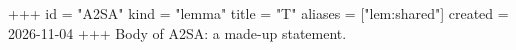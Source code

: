 +++
id = "A2SA"
kind = "lemma"
title = "T"
aliases = ["lem:shared"]
created = 2026-11-04
+++
Body of A2SA: a made-up statement.
